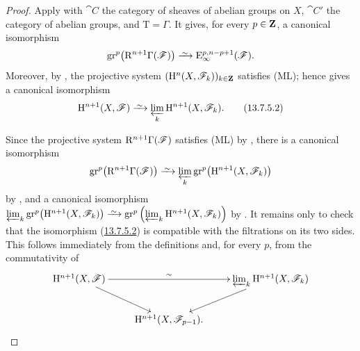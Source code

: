 \begin{proof}
Apply  with $\cat{C}$ the category of sheaves of
abelian groups on $X$, $\cat{C}'$ the category of abelian groups,
and $\mathrm{T}=\Gamma$.
It gives, for every $p\in\mathbf{Z}$, a canonical isomorphism
\[
  \mathrm{gr}^p\bigl(\RR^{n+1}\Gamma(\boldsymbol{\sh{F}})\bigr)
  \isoto
  \mathrm{E}_\infty^{p,n-p+1}(\boldsymbol{\sh{F}}).
\]
Moreover, by , the projective system
$(\mathrm{H}^n(X,\mathscr{F}_k))_{k\in\mathbf{Z}}$ satisfies {\rm(ML)}; hence
 gives a canonical isomorphism
\[
  \HH^{n+1}(X,\sh{F})
  \isoto
  \varprojlim_k\HH^{n+1}(X,\sh{F}_k).
\label{0.13.7.5.1b}
\tag{13.7.5.2}
\]

Since the projective system
$\mathrm{R}^{n+1}\Gamma(\boldsymbol{\mathscr{F}})$ satisfies {\rm(ML)} by
, there is a canonical isomorphism
\[
  \mathrm{gr}^p\bigl(\RR^{n+1}\Gamma(\boldsymbol{\sh{F}})\bigr)
  \isoto
  \varprojlim_k
  \mathrm{gr}^p\bigl(\HH^{n+1}(X,\sh{F}_k)\bigr)
\]
by , and a canonical isomorphism $\varprojlim_k
\mathrm{gr}^p\bigl(\HH^{n+1}(X,\sh{F}_k)\bigr)
\isoto
\mathrm{gr}^p\left(
\varprojlim_k\HH^{n+1}(X,\sh{F}_k)
\right)$
by .
It remains only to check that the isomorphism (\hyperref[0.13.7.5.1b]{13.7.5.2}) is
compatible with the filtrations on its two sides.
This follows immediately from the definitions and, for every $p$,
from the commutativity of
\[
  \xymatrix{
    \HH^{n+1}(X,\sh{F})
      \ar[rr]^-{\sim}\ar[dr]
    &&
    \varprojlim_k\HH^{n+1}(X,\sh{F}_k)
      \ar[dl]
    \\
    &
    \HH^{n+1}(X,\sh{F}_{p-1}).
  }
\]
\end{proof}

